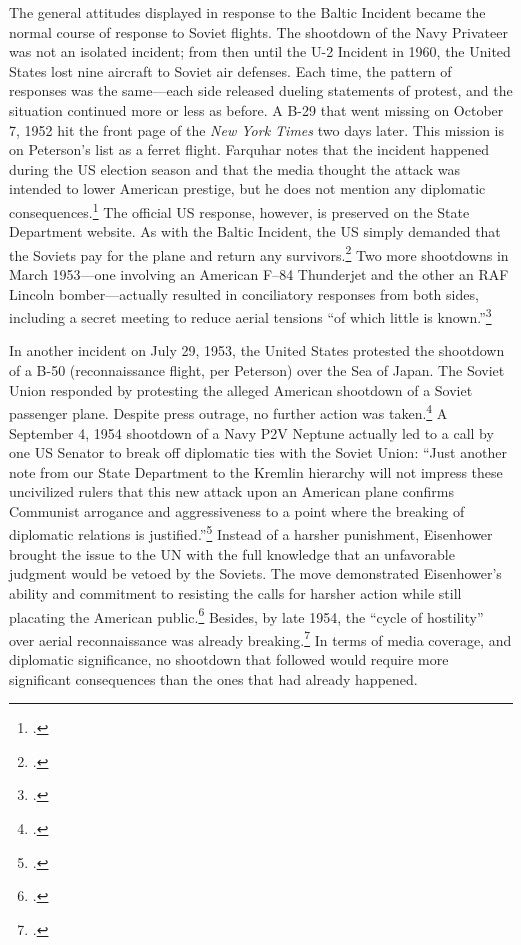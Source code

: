 \documentclass[14pt]{extarticle}
\begin{document}
The general attitudes displayed in response to the Baltic Incident became the normal course of response to Soviet flights. The shootdown of the Navy Privateer was not an isolated incident; from then until the U-2 Incident in 1960, the United States lost nine aircraft to Soviet air defenses. Each time, the pattern of responses was the same---each side released dueling statements of protest, and the situation continued more or less as before. A B-29 that went missing on October 7, 1952 hit the front page of the \emph{New York Times} two days later. This mission is on Peterson's list as a ferret flight. Farquhar notes that the incident happened during the US election season and that the media thought the attack was intended to lower American prestige, but he does not mention any diplomatic consequences.\footcite[p.~43-44]{farquhar_aerial_2015} The official US response, however, is preserved on the State Department website. As with the Baltic Incident, the US simply demanded that the Soviets pay for the plane and return any survivors.\footcite{the_new_york_times_u.s._1952} Two more shootdowns in March 1953---one involving an American F–84 Thunderjet and the other an RAF Lincoln bomber---actually resulted in conciliatory responses from both sides, including a secret meeting to reduce aerial tensions \enquote{of which little is known.}\footcite[p.~45]{farquhar_aerial_2015}

In another incident on July 29, 1953, the United States protested the shootdown of a B-50 (reconnaissance flight, per Peterson) over the Sea of Japan. The Soviet Union responded by protesting the alleged American shootdown of a Soviet passenger plane. Despite press outrage, no further action was taken.\footcite[p.~47]{farquhar_aerial_2015} A September 4, 1954 shootdown of a Navy P2V Neptune actually led to a call by one US Senator to break off diplomatic ties with the Soviet Union: \enquote{Just another note from our State Department to the Kremlin hierarchy will not impress these uncivilized rulers \textelp{} that this new attack upon an American plane confirms Communist arrogance and aggressiveness to a point where the breaking of diplomatic relations is justified.}\footcite{the_associated_press_ending_1954} Instead of a harsher punishment, Eisenhower brought the issue to the UN with the full knowledge that an unfavorable judgment would be vetoed by the Soviets. The move demonstrated Eisenhower's ability and commitment to resisting the calls for harsher action while still placating the American public.\footcite[p.~47]{farquhar_aerial_2015} Besides, by late 1954, the \enquote{cycle of hostility} over aerial reconnaissance was already breaking.\footcite[p.~49]{farquhar_aerial_2015} In terms of media coverage, and diplomatic significance, no shootdown that followed would require more significant consequences than the ones that had already happened.
\end{document}
